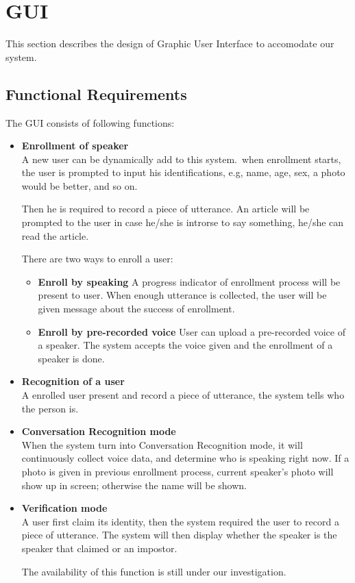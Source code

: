 \section{GUI}
	This section describes the design of Graphic User Interface to accomodate our system.
\subsection{Functional Requirements}
	The GUI consists of following functions:
	\begin{itemize}
		\item \textbf{Enrollment of speaker} \\
			A new user can be dynamically add to this system.\
			when enrollment starts, the user is prompted to input
			his identifications, e.g, name, age, sex, a photo would
			be better, and so on.

			Then he is required to record a piece of utterance.
			An article will be prompted to the user in case he/she
			is introrse to say something, he/she can read the article.

			There are two ways to enroll a user:
			\begin{itemize}
				\item \textbf{Enroll by speaking}
					A progress indicator of enrollment process will be present to user.
					When enough utterance is collected, the user will be given
					message about the success of enrollment.

				\item \textbf{Enroll by pre-recorded voice}
					User can upload a pre-recorded voice of a speaker. The system
					accepts the voice given and the enrollment of a speaker is done.
			\end{itemize}

		\item \textbf{Recognition of a user} \\
			A enrolled user present and record a piece of utterance,
			the system tells who the person is.

		\item \textbf{Conversation Recognition mode} \\
			When the system turn into Conversation Recognition mode,
			it will continuously collect voice data, and determine
			who is speaking right now. If a photo is given in previous
			enrollment process, current speaker's photo will show up
			in screen; otherwise the name will be shown.

		\item \textbf{Verification mode} \\
			A user first claim its identity, then the system required
			the user to record a piece of utterance. The system will
			then display whether the speaker is the speaker that claimed
			or an impostor.

			The availability of this function is still under our investigation.

	\end{itemize}

